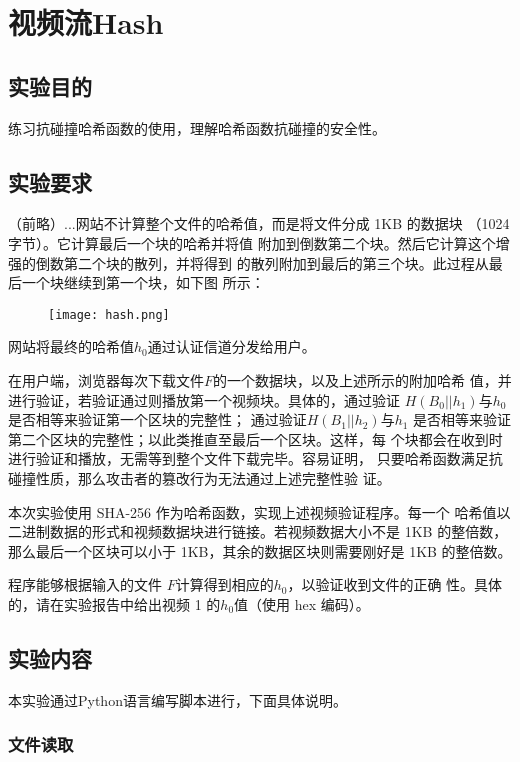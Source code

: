 \setcounter{chapter}{3}
\chapter{视频流Hash}

\section{实验目的}
练习抗碰撞哈希函数的使用，理解哈希函数抗碰撞的安全性。

\section{实验要求}

（前略）...网站不计算整个文件的哈希值，而是将文件分成 1KB 的数据块
（1024 字节）。它计算最后一个块的哈希并将值
附加到倒数第二个块。然后它计算这个增强的倒数第二个块的散列，并将得到
的散列附加到最后的第三个块。此过程从最后一个块继续到第一个块，如下图
所示：

\begin{figure}[!htbp]
\centering
\texttt{[image: hash.png]}
\end{figure}

网站将最终的哈希值$h_0$通过认证信道分发给用户。

在用户端，浏览器每次下载文件$F$的一个数据块，以及上述所示的附加哈希
值，并进行验证，若验证通过则播放第一个视频块。具体的，通过验证
$H(B_0||h_1)$与$h_0$是否相等来验证第一个区块的完整性； 
通过验证$H(B_1||h_2)$与$h_1$
是否相等来验证第二个区块的完整性；以此类推直至最后一个区块。这样，每
个块都会在收到时进行验证和播放，无需等到整个文件下载完毕。容易证明，
只要哈希函数满足抗碰撞性质，那么攻击者的篡改行为无法通过上述完整性验
证。

本次实验使用 SHA-256 作为哈希函数，实现上述视频验证程序。每一个
哈希值以二进制数据的形式和视频数据块进行链接。若视频数据大小不是 1KB
的整倍数，那么最后一个区块可以小于 1KB，其余的数据区块则需要刚好是
1KB 的整倍数。

程序能够根据输入的文件 $F$计算得到相应的$h_0$，以验证收到文件的正确
性。具体的，请在实验报告中给出视频 1 的$h_0$值（使用 hex 编码）。

\newpage
\section{实验内容}

本实验通过Python语言编写脚本进行，下面具体说明。

\subsection{文件读取}

